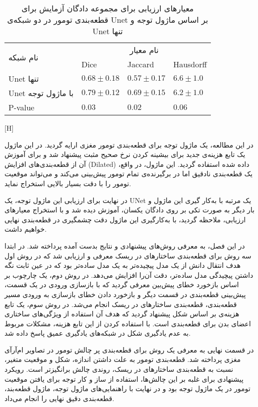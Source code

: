\begin{table}[H]
	\caption{معیارهای ارزیابی برای مجموعه دادگان آزمایش برای قطعه‌بندی تومور در دو شبکه‌ی Unet بر اساس ماژول توجه و Unet تنها}
	\label{attable}
	\begin{tabular}{llll}
		\hline
		\multirow{2}{*}{نام شبکه} & \multicolumn{3}{c}{نام معیار}                     \\ \cline{2-4} 
		& Dice  & Jaccard  & Hausdorff    \\ \hline
		Unet تنها     & $0.68 \pm 0.18$ & $0.57 \pm 0.17$   & $6.6 \pm 1.0 $           \\ \hline
		Unet با ماژول توجه      & $0.79 \pm 0.12$ & $0.69 \pm 0.15$   & $6.2 \pm 1.0$            \\ \hline
		P-value                      & $0.03 $       & $0.02 $         & $0.06$                 \\ \hline
	\end{tabular}
\end{table}


[H]


در این مطالعه، یک ماژول توجه برای قطعه‌بندی تومور مغزی ارایه گردید. در این ماژول یک تابع هزینه‌ی جدید برای بیشینه کردن نرخ صحیح مثبت پیشنهاد شد و برای آموزش آن از قطعه‌بندی‌های افزایش (Dilated) داده شده استفاده گردید. این ماژول، در واقع، یک قطعه‌بندی نادقیق اما در برگیرنده‌ی تمام تومور پیش‌بینی می‌کند و می‌تواند موقعیت تومور را با دقت بسیار بالایی استخراج نماید. 

در نهایت برای ارزیابی این ماژول توجه، یک UNet یک مرتبه با به‌کار گیری این ماژول و بار دیگر به صورت تکی بر روی دادگان یکسان، آموزش دیده شد و با استخراج معیارهای ارزیابی، ملاحظه گردید، با به‌کارگیری این ماژول دقت چشمگیری در قطعه‌بندی نهایی خواهیم داشت.


در این فصل، به معرفی روش‌های پیشنهادی و نتایج بدست آمده پرداخته شد. در ابتدا سه روش برای قطعه‌بندی ساختارهای در ریسک معرفی و ارزیابی شد که در روش اول هدف انتقال دانش از یک مدل پیچیده‌تر به یک مدل ساده‌تر بود که در عین ثابت نگه داشتن پیچیدگی مدل ساده‌تر، دقت آن‌را افزایش می‌دهد. در روش دوم، یک چارچوب بر اساس بازخورد خطای پیش‌بین معرفی گردید که با بازسازی ورودی در یک قسمت، پیش‌بینی قطعه‌بندی در قسمت دیگر و بازخورد دادن خطای بازسازی به ورودی مسیر قطعه‌بندی، قطعه‌بندی ساختارهای در ریسک انجام می‌شد. در روش سوم، یک تابع هزینه‌ی بر اساس شکل پیشنهاد گردید که هدف آن استفاده از ویژگی‌های ساختاری اعضای بدن برای قطعه‌بندی است. با استفاده کردن از این تابع هزینه، مشکلات مربوط به عدم یادگیری شکل در شبکه‌های یادگیری عمیق پاسخ داده شد.

در قسمت نهایی به معرفی یک روش برای قطعه‌بندی پر چالش تومور در تصاویر ام‌آرآی مغزی پرداخته شد. قطعه‌بندی تومور به علت داشتن اندازه، شکل و موقعیت متغیر، نسبت به قطعه‌بندی ساختارهای در ریسک، روندی چالش برانگیزتر است. رویکرد پیشنهادی برای غلبه بر این چالش‌ها، استفاده از ساز و کار توجه برای یافتن موقعیت تومور در یک ماژول توجه بود و در نهایت با راهنمایی‌های ماژول توجه، ماژول قطعه‌بند، قطعه‌بندی دقیق نهایی را انجام می‌داد. 


